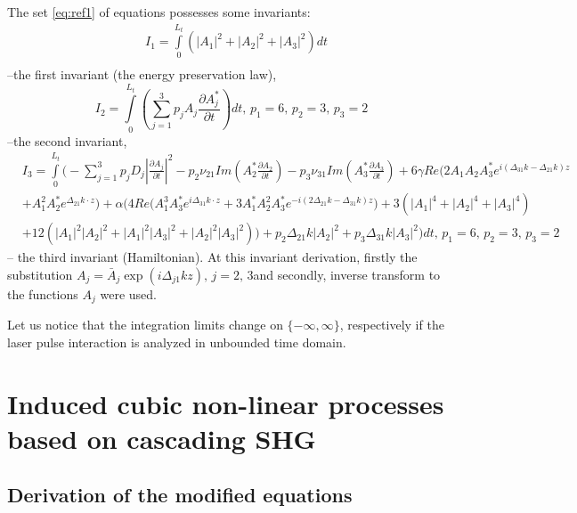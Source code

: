 \documentclass[a4paper, 12pt, onecolumn]{extarticle}
\begin{document}
The set \eqref{eq:ref1} of equations  possesses some invariants:
\begin{equation}
\label{eq:inv1}
\begin{aligned}
&I_1=\int\limits_0^{L_t}\left(|A_1|^2+|A_2|^2+|A_3|^2\right)dt\\
\end{aligned}
\end{equation}
--the first invariant (the energy preservation law),
\begin{equation}
I_2=\int\limits_0^{L_t}\left(\sum\limits_{j=1}^3 p_j A_j \frac{\partial A_j^*}{\partial t}\right)dt,\,p_1=6,\, p_2=3,\, p_3=2
\end{equation}
--the second invariant,
\begin{equation}
\label{eq:inv3}
\begin{aligned}
&I_3=\int\limits_0^{L_t}\Big(-\sum\limits_{j=1}^3 p_jD_j |\frac{\partial A_j}{\partial t}|^2-p_2\nu_{21}Im\left(A_2^*\frac{\partial A_2}{\partial t}\right)-p_3\nu_{31}Im\left(A_3^*\frac{\partial A_3}{\partial t}\right)+6\gamma Re\bigl(2A_1 A_2 A_3^*e^{i(\Delta_{31}k-\Delta_{21}k)z}\\
&+A_1^2 A_2^*e^{\Delta_{21}k\cdot z}\bigr)+\alpha\big(4Re\bigl({A_1^3}{A_3^*}e^{i\Delta_{31}k\cdot z}+3{A_1^*}{A_2^2}{A_3^*}e^{-i(2\Delta_{21}k-\Delta_{31}k)z}\bigr)+3({|A_1|^4}+{|A_2|^4}+{|A_3|^4})\\
&+12({|A_1|^2}{|A_2|^2}+{|A_1|^2}{|A_3|^2}+{|A_2|^2}{|A_3|^2}))+p_2\Delta_{21} k|A_2|^2+p_3\Delta_{31} k|A_3|^2\Big)dt,\,p_1=6,\, p_2=3,\, p_3=2
\end{aligned}
\end{equation}
-- the third invariant (Hamiltonian). At this invariant derivation, firstly the substitution $A_j=\bar{A}_j\exp(i\Delta_{j1}kz),\,j=2,\,3$and secondly, inverse transform to the functions $A_j$ were used.

Let us notice that  the integration limits change on \(\{-\infty,\infty\}\), respectively if the laser pulse interaction is analyzed in unbounded time domain. 

\section*{Induced cubic non-linear processes based on cascading SHG}

\subsection*{Derivation of the modified  equations}
\end{document}
